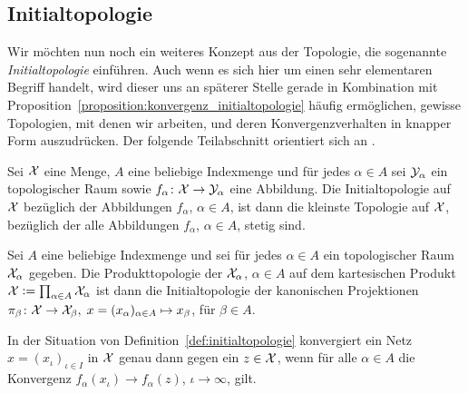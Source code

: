 \documentclass[../thesis/thesis.tex]{subfiles}
\begin{document}
	\subsection*{Initialtopologie}
	
	Wir möchten nun noch ein weiteres Konzept aus der Topologie, die sogenannte \emph{Initialtopologie} einführen.
	Auch wenn es sich hier um einen sehr elementaren Begriff handelt, wird dieser uns an späterer Stelle gerade 
	in Kombination mit Proposition~\ref{proposition:konvergenz_initialtopologie} häufig ermöglichen, 
	gewisse Topologien, mit denen wir arbeiten, und deren Konvergenzverhalten in knapper Form auszudrücken. 
	Der folgende Teilabschnitt orientiert sich an \cite[Section 2.13]{Aliprantis.2006}.
	
	\begin{Definition}[Initialtopologie]
		\label{def:initialtopologie}
		Sei $\mathcal{X}$ eine Menge, $A$ eine beliebige Indexmenge und für jedes $\alpha \in A$ sei $\mathcal{Y}_\alpha$ ein topologischer Raum sowie $f_\alpha \colon \mathcal{X} \to \mathcal{Y}_\alpha$ eine Abbildung.
		Die Initialtopologie auf $\mathcal{X}$ bezüglich der Abbildungen $f_\alpha$, $\alpha \in A$, ist dann die kleinste Topologie auf $\mathcal{X}$, bezüglich der alle Abbildungen 
		$f_\alpha$, $\alpha \in A$, stetig sind.
	\end{Definition}

	\begin{Bemerkung}[Produkttopologie]
		Sei $A$ eine beliebige Indexmenge und sei für jedes $\alpha \in A$ ein topologischer Raum $\mathcal{X}_\alpha$ gegeben. Die Produkttopologie der $\mathcal{X}_\alpha$, $\alpha \in A$
		auf dem kartesischen Produkt $\mathcal{X} \vcentcolon = \prod_{\alpha \in A} \mathcal{X}_\alpha$ ist dann die Initialtopologie der kanonischen Projektionen 
		$\pi_\beta \colon \mathcal{X} \to \mathcal{X}_\beta, \; x = (x_\alpha)_{\alpha \in A} \mapsto x_\beta $, für $\beta \in A$.
	\end{Bemerkung}
	
	\begin{Proposition}
		\label{proposition:konvergenz_initialtopologie}
		In der Situation von Definition~\ref{def:initialtopologie} konvergiert ein Netz $x = (x_{\iota})_{\iota \in I}$ in $\mathcal{X}$ genau dann gegen ein $z \in \mathcal{X}$, wenn für alle $\alpha \in A$
		die Konvergenz $f_\alpha(x_\iota) \to f_\alpha(z)$, $\iota \to \infty$, gilt.
	\end{Proposition}
\end{document}

